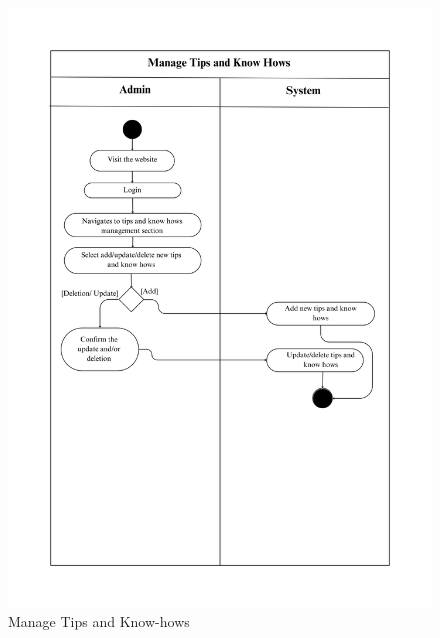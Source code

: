 \begin{figure}[h]
    \centering
    \includegraphics[width=1\textwidth]{Images/Activity Diagrams/31 Manage Tips and Know Hows.png}
    \caption{Manage Tips and Know-hows}
    \label{fig:activity-manage-tips}
\end{figure}

